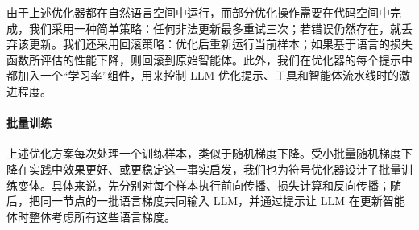 由于上述优化器都在自然语言空间中运行，而部分优化操作需要在代码空间中完成，我们采用一种简单策略：任何非法更新最多重试三次；若错误仍然存在，就丢弃该更新。我们还采用回滚策略：优化后重新运行当前样本；如果基于语言的损失函数所评估的性能下降，则回滚到原始智能体。此外，我们在优化器的每个提示中都加入一个“学习率”组件，用来控制 LLM 优化提示、工具和智能体流水线时的激进程度。

\paragraph{批量训练}
上述优化方案每次处理一个训练样本，类似于随机梯度下降。受小批量随机梯度下降在实践中效果更好、或更稳定这一事实启发，我们也为符号优化器设计了批量训练变体。具体来说，先分别对每个样本执行前向传播、损失计算和反向传播；随后，把同一节点的一批语言梯度共同输入 LLM，并通过提示让 LLM 在更新智能体时整体考虑所有这些语言梯度。
